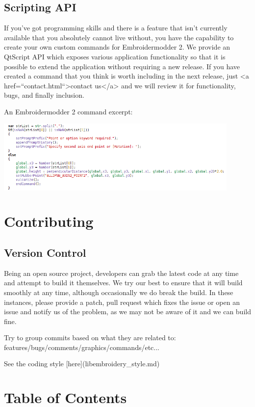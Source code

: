 \documentclass[a4paper, 11pt]{report}
\begin{document}
\subsection{Scripting API}

If you've got programming skills and there is a feature that isn't currently available that you absolutely cannot live without, you have the capability to create your own custom commands for Embroidermodder 2. We provide an QtScript API which exposes various application functionality so that it is possible to extend the application without requiring a new release. If you have created a command that you think is worth including in the next release, just <a href=``contact.html``>contact us</a> and we will review it for functionality, bugs, and finally inclusion.

An Embroidermodder 2 command excerpt:

\includegraphics[width=0.9\textwidth]{images/features-scripting-1.png}

\section{Contributing}

\subsection{Version Control}

Being an open source project, developers can grab the latest code at any time
and attempt to build it themselves. We try our best to ensure that it will build smoothly
at any time, although occasionally we do break the build. In these instances,
please provide a patch, pull request which fixes the issue or open an issue and
notify us of the problem, as we may not be aware of it and we can build fine.

Try to group commits based on what they are related to: features/bugs/comments/graphics/commands/etc...

See the coding style [here](libembroidery\_style.md)

\section{Table of Contents}
\end{document}
